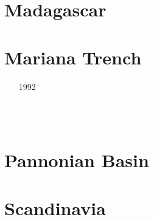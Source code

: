 \section{Madagascar}

\begin{scriptsize}
\begin{itemize}
\item[\twothousandtwenty]
\end{itemize}
\end{scriptsize}

\section{Mariana Trench}

\begin{scriptsize}
\begin{itemize}
\item[1992]
\item[\twothousandfifteen]
\\
\\
\item[\twothousandeighteen]
\item[\twothousandtwentythree]
\end{itemize}
\end{scriptsize}

\section{Pannonian Basin}

\begin{scriptsize}
\begin{itemize}
\item[\twothousandone]
\item[\twothousandtwo]
\item[\twothousandtwentyone]
\end{itemize}
\end{scriptsize}

\section{Scandinavia}


